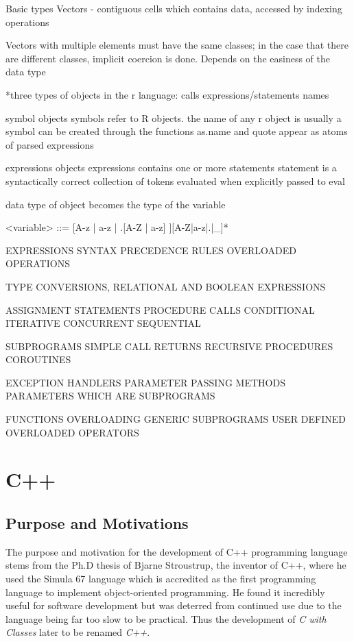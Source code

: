\documentclass[12pt]{article}
\begin{document}
Basic types
Vectors - contiguous cells which contains data, accessed by indexing operations

Vectors with multiple elements must have the same classes; in the case that there are different classes, implicit coercion is done. Depends on the easiness of the data type

*three types of objects in the r language:
calls
expressions/statements
names

symbol objects
symbols refer to R objects. the name of any r object is usually a symbol
can be created through the functions as.name and quote
appear as atoms of parsed expressions

expressions objects
expressions contains one or more statements
statement is a syntactically correct collection of tokens
evaluated when explicitly passed to eval

data type of object becomes the type of the variable


<variable> ::= [A-z | a-z | .[A-Z | a-z] ][A-Z|a-z|.|_]*



EXPRESSIONS
SYNTAX
PRECEDENCE RULES
OVERLOADED OPERATIONS

TYPE CONVERSIONS, RELATIONAL AND BOOLEAN EXPRESSIONS

ASSIGNMENT STATEMENTS
PROCEDURE CALLS
CONDITIONAL
ITERATIVE
CONCURRENT
SEQUENTIAL

SUBPROGRAMS
SIMPLE CALL RETURNS
RECURSIVE PROCEDURES
COROUTINES

EXCEPTION HANDLERS
PARAMETER PASSING METHODS
PARAMETERS WHICH ARE SUBPROGRAMS

FUNCTIONS OVERLOADING
GENERIC SUBPROGRAMS
USER DEFINED OVERLOADED OPERATORS

\fi


\section{C++}
\subsection{Purpose and Motivations}
The purpose and motivation for the development of C++ programming language stems from the Ph.D thesis of Bjarne Stroustrup, the
inventor of C++, where he used the Simula 67 language which is accredited as the first programming language to implement 
object-oriented programming. He found it incredibly useful for software development but was deterred from continued use
due to the language being far too slow to be practical. Thus the development of \textit{C with Classes} later to be renamed \textit{C++}.
\end{document}
